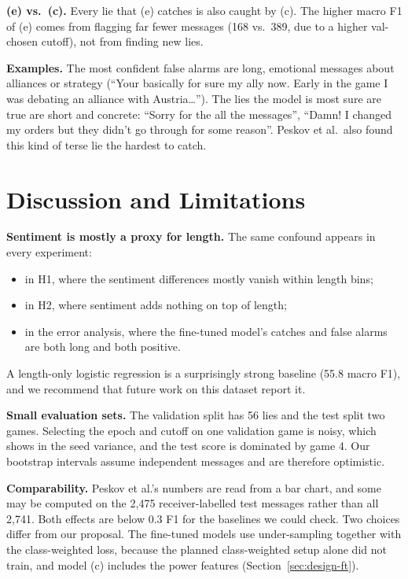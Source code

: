 \documentclass[conference]{IEEEtran}
\begin{document}
\textbf{(e) vs.\ (c).} Every lie that (e) catches is also caught by (c). The higher macro F1 of (e) comes from flagging far fewer messages (168 vs.\ 389, due to a higher val-chosen cutoff), not from finding new lies.

\textbf{Examples.} The most confident false alarms are long, emotional messages about alliances or strategy (``Your basically for sure my ally now. Early in the game I was debating an alliance with Austria\dots''). The lies the model is most sure are true are short and concrete: ``Sorry for the all the messages'', ``Damn! I changed my orders but they didn't go through for some reason''. Peskov et al.\ also found this kind of terse lie the hardest to catch.

\section{Discussion and Limitations}
\label{sec:discussion}

\textbf{Sentiment is mostly a proxy for length.} The same confound appears in every experiment:
\begin{itemize}
\item in H1, where the sentiment differences mostly vanish within length bins;
\item in H2, where sentiment adds nothing on top of length;
\item in the error analysis, where the fine-tuned model's catches and false alarms are both long and both positive.
\end{itemize}
A length-only logistic regression is a surprisingly strong baseline (55.8 macro F1), and we recommend that future work on this dataset report it.

\textbf{Small evaluation sets.} The validation split has 56 lies and the test split two games. Selecting the epoch and cutoff on one validation game is noisy, which shows in the seed variance, and the test score is dominated by game 4. Our bootstrap intervals assume independent messages and are therefore optimistic.

\textbf{Comparability.} Peskov et al.'s numbers are read from a bar chart, and some may be computed on the 2,475 receiver-labelled test messages rather than all 2,741. Both effects are below 0.3 F1 for the baselines we could check. Two choices differ from our proposal. The fine-tuned models use under-sampling together with the class-weighted loss, because the planned class-weighted setup alone did not train, and model (c) includes the power features (Section~\ref{sec:design-ft}).
\end{document}

